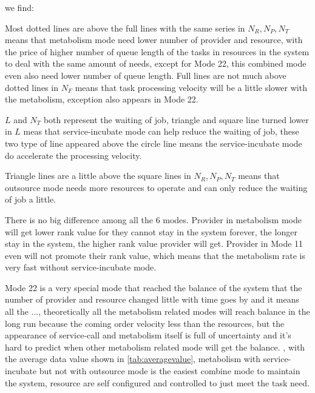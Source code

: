 we find: \begin{inparaenum}[1)]
\item Most dotted lines are above the full lines with the same series in $N_R,N_P,N_T$ means that metabolism mode need lower number of provider and resource, with the price of higher number of queue length of the tasks in resources in the system to deal with the same amount of needs, except for Mode 22, this combined mode even also need lower number of queue length. Full lines are not much above dotted lines in $N_F$ means that task processing velocity will be a little slower with the metabolism, exception also appears in Mode 22. 
\item $L$ and $N_T$ both represent the waiting of job, triangle and square line turned lower in $L$ meas that service-incubate mode can help reduce the waiting of job, these two type of line appeared above the circle line means the service-incubate mode do accelerate the processing velocity.
\item Triangle lines are a little above the square lines in $N_R,N_P,N_T$ means that outsource mode needs more resources to operate and can only reduce the waiting of job a little.
\item There is no big difference among all the 6 modes. Provider in metabolism mode will get lower rank value for they cannot stay in the system forever, the longer stay in the system, the higher rank value provider will get. Provider in Mode 11 even will not promote their rank value, which means that the metabolism rate is very fast without service-incubate mode.
\item Mode 22 is a very special mode that reached the balance of the system that the number of provider and resource changed little with time goes by and it means all the ..., theoretically all the metabolism related modes will reach balance in the long run because the coming order velocity less than the resources, but the appearance of service-call and metabolism itself is full of uncertainty and it's hard to predict when other metabolism related mode will get the balance. , with the average data value shown in \autoref{tab:averagevalue}, metabolism with service-incubate but not with outsource mode is the easiest combine mode to maintain the system, resource are self configured and controlled to just meet the task need.
\end{inparaenum}



